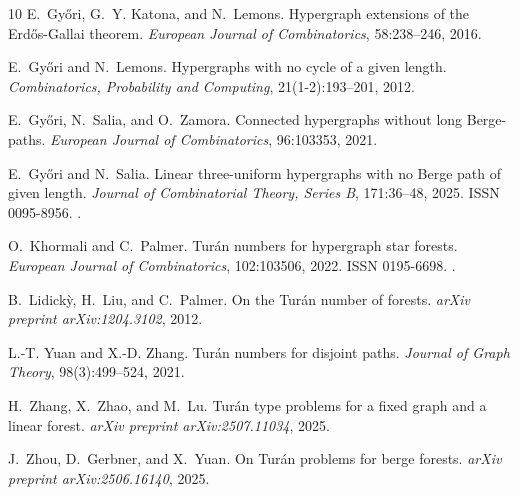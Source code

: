 \documentclass[12pt]{article}%
\begin{document}
\begin{thebibliography}{10}
E.~Gy{\H{o}}ri, G.~Y. Katona, and N.~Lemons.
\newblock Hypergraph extensions of the Erd{\H{o}}s-Gallai theorem.
\newblock \emph{European Journal of Combinatorics}, 58:238--246, 2016.

E.~Gy{\H{o}}ri and N.~Lemons.
\newblock Hypergraphs with no cycle of a given length.
\newblock \emph{Combinatorics, Probability and Computing}, 21(1-2):193--201,
  2012.

E.~Gy{\H{o}}ri, N.~Salia, and O.~Zamora.
\newblock Connected hypergraphs without long Berge-paths.
\newblock \emph{European Journal of Combinatorics}, 96:103353, 2021.

E.~Győri and N.~Salia.
\newblock Linear three-uniform hypergraphs with no Berge path of given length.
\newblock \emph{Journal of Combinatorial Theory, Series B}, 171:36--48, 2025.
\newblock ISSN 0095-8956.
\newblock {}.



O.~Khormali and C.~Palmer.
\newblock Turán numbers for hypergraph star forests.
\newblock \emph{European Journal of Combinatorics}, 102:103506, 2022.
\newblock ISSN 0195-6698.
\newblock {}.

B.~Lidick{\`y}, H.~Liu, and C.~Palmer.
\newblock On the Tur{\'a}n number of forests.
\newblock \emph{arXiv preprint arXiv:1204.3102}, 2012.

L.-T. Yuan and X.-D. Zhang.
\newblock Tur{\'a}n numbers for disjoint paths.
\newblock \emph{Journal of Graph Theory}, 98(3):499--524, 2021.

H.~Zhang, X.~Zhao, and M.~Lu.
\newblock Tur\'an type problems for a fixed graph and a linear forest.
\newblock \emph{arXiv preprint arXiv:2507.11034}, 2025.

J.~Zhou, D.~Gerbner, and X.~Yuan.
\newblock On Tur\'an problems for berge forests.
\newblock \emph{arXiv preprint arXiv:2506.16140}, 2025.


\end{thebibliography}
\end{document}
